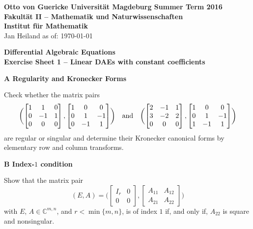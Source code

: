 \documentclass[a4paper,10pt]{article}
\begin{document}
{\bf Otto von Guericke Universit{\"a}t Magdeburg \hfill Summer Term 2016} \\
{\bf Fakult\"at II -- Mathematik und Naturwissenschaften} \\
{\bf Institut f\"ur Mathematik} \\
Jan Heiland \hfill as of: \today \\


\bigskip
\begin{center}
\textbf{\large Differential Algebraic Equations}\\
\smallskip
\textbf{Exercise Sheet 1 -- Linear DAEs with constant coefficients}\\
\end{center}

\bigskip


{\bf A Regularity and Kronecker Forms}

Check whether the matrix pairs 
\begin{equation*}
	\biggl( 
\begin{bmatrix} 1 & 1 &0 \\ 0 &-1 &1 \\ 0 &0 &0 \end{bmatrix},
\begin{bmatrix} 1  &0 &0 \\ 0 &1 &-1 \\ 0 &-1 &1 \end{bmatrix}
	\biggr)
	\quad \text{and} \quad
	\biggl( 
\begin{bmatrix} 2 &-1 &1 \\ 3 &-2 &2 \\ 0 &0 &0 \end{bmatrix},
\begin{bmatrix} 1 &0 &0 \\ 0 &1 &-1 \\ 1 &-1 &1 \end{bmatrix}
	\biggr)
\end{equation*}
are regular or singular and determine their Kronecker canonical forms by elementary row and column transforms.
\smallskip

{\bf B Index-$1$ condition}

Show that the matrix pair 
\begin{equation*}
	(E, A) = 
	\biggl( 
\begin{bmatrix} I_r &0 \\ 0 &0 \end{bmatrix}, 
	\begin{bmatrix} A_{11} & A_{12} \\ A_{21} & A_{22} \end{bmatrix}
	\biggr)
\end{equation*}
with $E$, $A\in \mathbb C^{m,n}$, and $r<\min\{m,n\}$, is of index $1$ if, and only if, $A_{22}$ is square and nonsingular.
\end{document}
